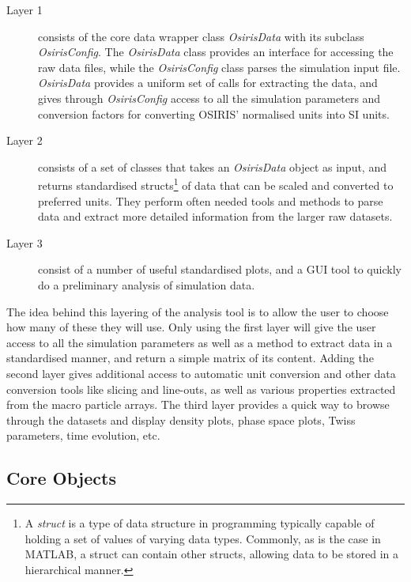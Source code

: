 \begin{description}
    \item[Layer 1] consists of the core data wrapper class \emph{OsirisData} with its subclass \emph{OsirisConfig}.
        The \emph{OsirisData} class provides an interface for accessing the raw data files, while the \emph{OsirisConfig} class parses the simulation input file.
        \emph{OsirisData} provides a uniform set of calls for extracting the data, and gives through \emph{OsirisConfig} access to all the simulation parameters and conversion factors for converting OSIRIS' normalised units into SI units.
    \item[Layer 2] consists of a set of classes that takes an \emph{OsirisData} object as input, and returns standardised structs\footnote{A \textit{struct} is a type of data structure in programming typically capable of holding a set of values of varying data types. Commonly, as is the case in MATLAB, a struct can contain other structs, allowing data to be stored in a hierarchical manner.} of data that can be scaled and converted to preferred units.
    They perform often needed tools and methods to parse data and extract more detailed information from the larger raw datasets.
    \item[Layer 3] consist of a number of useful standardised plots, and a GUI tool to quickly do a preliminary analysis of simulation data.
\end{description}

The idea behind this layering of the analysis tool is to allow the user to choose how many of these they will use.
Only using the first layer will give the user access to all the simulation parameters as well as a method to extract data in a standardised manner, and return a simple matrix of its content.
Adding the second layer gives additional access to automatic unit conversion and other data conversion tools like slicing and line-outs, as well as various properties extracted from the macro particle arrays.
The third layer provides a quick way to browse through the datasets and display density plots, phase space plots, Twiss parameters, time evolution, etc.

\subsection{Core Objects}
\label{Tools:OALay1}

